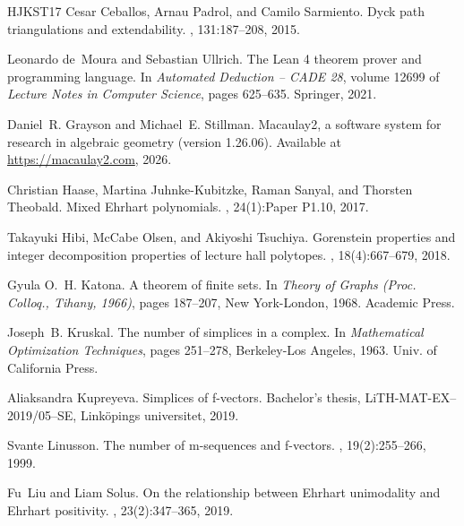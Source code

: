\documentclass[11pt, a4paper, abstract=yes]{scrartcl}
\theoremstyle{definition}
\theoremstyle{remark}
\theoremstyle{plain}
\theoremstyle{remark}
\theoremstyle{plain}
\begin{document}
\begin{thebibliography}{HJKST17}
Cesar Ceballos, Arnau Padrol, and Camilo Sarmiento.
\newblock Dyck path triangulations and extendability.
, 131:187--208, 2015.

Leonardo de~Moura and Sebastian Ullrich.
\newblock The {L}ean 4 theorem prover and programming language.
\newblock In {\em Automated Deduction -- {CADE} 28}, volume 12699 of {\em
  Lecture Notes in Computer Science}, pages 625--635. Springer, 2021.

Daniel~R. Grayson and Michael~E. Stillman.
\newblock Macaulay2, a software system for research in algebraic geometry
  (version 1.26.06).
\newblock Available at \url{https://macaulay2.com}, 2026.

Christian Haase, Martina Juhnke-Kubitzke, Raman Sanyal, and Thorsten Theobald.
\newblock Mixed {E}hrhart polynomials.
, 24(1):Paper P1.10,
  2017.

Takayuki Hibi, McCabe Olsen, and Akiyoshi Tsuchiya.
\newblock Gorenstein properties and integer decomposition properties of lecture
  hall polytopes.
, 18(4):667--679, 2018.

Gyula O.~H. Katona.
\newblock A theorem of finite sets.
\newblock In {\em Theory of Graphs (Proc. Colloq., Tihany, 1966)}, pages
  187--207, New York-London, 1968. Academic Press.

Joseph~B. Kruskal.
\newblock The number of simplices in a complex.
\newblock In {\em Mathematical Optimization Techniques}, pages 251--278,
  Berkeley-Los Angeles, 1963. Univ. of California Press.

Aliaksandra Kupreyeva.
\newblock Simplices of f-vectors.
\newblock Bachelor's thesis, {LiTH-MAT-EX--2019/05--SE}, Link{\"o}pings
  universitet, 2019.

Svante Linusson.
\newblock The number of m-sequences and f-vectors.
, 19(2):255--266, 1999.

Fu~Liu and Liam Solus.
\newblock On the relationship between {E}hrhart unimodality and {E}hrhart
  positivity.
, 23(2):347--365, 2019.


\end{thebibliography}
\end{document}
